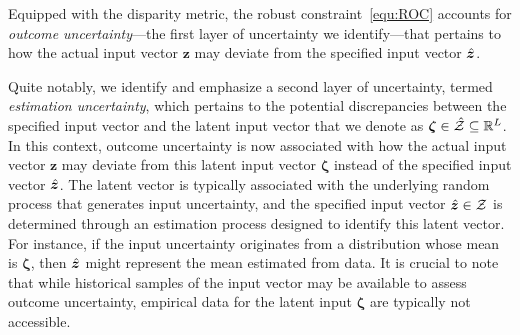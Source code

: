 \documentclass[opre, nonblindrev]{informswp}
\newcommand{\1}[1]{\mathds{1}{\left(#1\right)}}
\begin{document}

Equipped with the disparity metric, the robust constraint~\eqref{equ:ROC} accounts for \textit{outcome uncertainty}---the first layer of uncertainty we identify---that pertains to how the actual input vector $\bm z$ may deviate from the specified input vector $\hat{\bm{z}}$.

Quite notably, we identify and emphasize a second layer of uncertainty, termed \textit{estimation uncertainty}, which pertains to the potential discrepancies between the specified input vector and the latent input vector that we denote as $\bm{\zeta} \in \hat{\mathcal{Z}} \subseteq \mathbb{R}^L$. In this context, outcome uncertainty is now associated with how the actual input vector $\bm z$ may deviate from this latent input vector $\bm{\zeta}$ instead of the specified input vector $\hat{\bm{z}}$. The latent vector is typically associated with the underlying random process that generates input uncertainty, and the specified input vector $\hat{\bm{z}} \in \mathcal{Z}$ is determined through an estimation process designed to identify this latent vector. For instance, if the input uncertainty originates from a distribution whose mean is $\bm \zeta$, then $\hat{\bm{z}}$ might represent the mean estimated from data. It is crucial to note that while historical samples of the input vector may be available to assess outcome uncertainty, empirical data for the latent input $\bm \zeta$ are typically not accessible.
\end{document}
